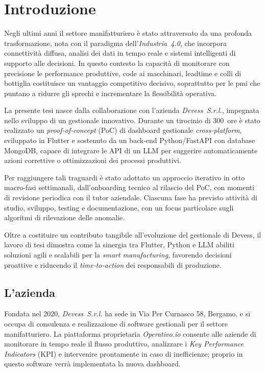 \chapter{Introduzione}
\label{chap:introduzione}

Negli ultimi anni il settore manifatturiero è stato attraversato da una profonda trasformazione, nota con il paradigma dell’\textit{Industria~4.0}, che 
incorpora connettività diffusa, analisi dei dati in tempo reale e sistemi intelligenti di supporto alle decisioni. In questo contesto la capacità di monitorare con 
precisione le performance produttive, code ai macchinari, \gls{leadtime} e colli di bottiglia costituisce un vantaggio competitivo decisivo, soprattutto per le \gls{pmi} che puntano a ridurre gli sprechi e incrementare la flessibilità operativa.

La presente tesi nasce dalla collaborazione con l’azienda \textit{Devess~S.r.l.}, impegnata nello sviluppo di un gestionale innovativo. Durante un tirocinio di 300~ore è 
stato realizzato un \textit{proof‑of‑concept} (\gls{PoC}) di dashboard gestionale \textit{cross‑platform}, sviluppato in Flutter e sostenuto da un back‑end Python/FastAPI 
con database MongoDB, capace di integrare le \gls{API} di un \gls{LLM} per suggerire automaticamente azioni correttive o ottimizzazioni dei processi produttivi.

Per raggiungere tali traguardi è stato adottato un approccio iterativo in otto macro‑fasi settimanali, dall’onboarding tecnico al rilascio del PoC, con momenti di revisione 
periodica con il tutor aziendale. Ciascuna fase ha previsto attività di studio, sviluppo, testing e documentazione, con un focus particolare sugli algoritmi di rilevazione delle anomalie.

Oltre a costituire un contributo tangibile all’evoluzione del gestionale di Devess, il lavoro di tesi dimostra come la sinergia tra Flutter, Python e LLM abiliti soluzioni 
agili e scalabili per la \textit{smart manufacturing}, favorendo decisioni proattive e riducendo il \textit{time‑to‑action} dei responsabili di produzione.

\section{L'azienda}
Fondata nel 2020, \textit{Devess~S.r.l.} ha sede in Via Per Curnasco 58, Bergamo, e si occupa di consulenza e realizzazione di software gestionali per il settore manifatturiero. 
La piattaforma proprietaria \textit{Operativo.io} consente alle aziende di monitorare in tempo reale il flusso produttivo, analizzare i \textit{Key Performance Indicators} 
(\gls{KPI}) e intervenire prontamente in caso di inefficienze; proprio in questo software verrà implementata la nuova dashboard.

